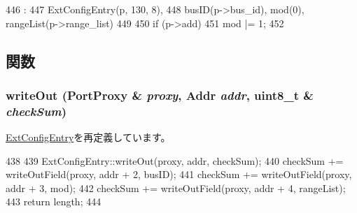 \begin{DoxyCode}
446                                                               :
447     ExtConfigEntry(p, 130, 8),
448     busID(p->bus_id), mod(0), rangeList(p->range_list)
449 {
450     if (p->add)
451         mod |= 1;
452 }

\end{DoxyCode}


\subsection{関数}
\hypertarget{classX86ISA_1_1IntelMP_1_1CompatAddrSpaceMod_a5fffc1006b1f28bd779d83ffbe213b4f}{
\subsubsection[{writeOut}]{ writeOut ({\bf PortProxy} \& {\em proxy}, \/  {\bf Addr} {\em addr}, \/  uint8\_\-t \& {\em checkSum})}}
\label{classX86ISA_1_1IntelMP_1_1CompatAddrSpaceMod_a5fffc1006b1f28bd779d83ffbe213b4f}


\hyperlink{classX86ISA_1_1IntelMP_1_1ExtConfigEntry_a5fffc1006b1f28bd779d83ffbe213b4f}{ExtConfigEntry}を再定義しています。


\begin{DoxyCode}
438 {
439     ExtConfigEntry::writeOut(proxy, addr, checkSum);
440     checkSum += writeOutField(proxy, addr + 2, busID);
441     checkSum += writeOutField(proxy, addr + 3, mod);
442     checkSum += writeOutField(proxy, addr + 4, rangeList);
443     return length;
444 }
\end{DoxyCode}


